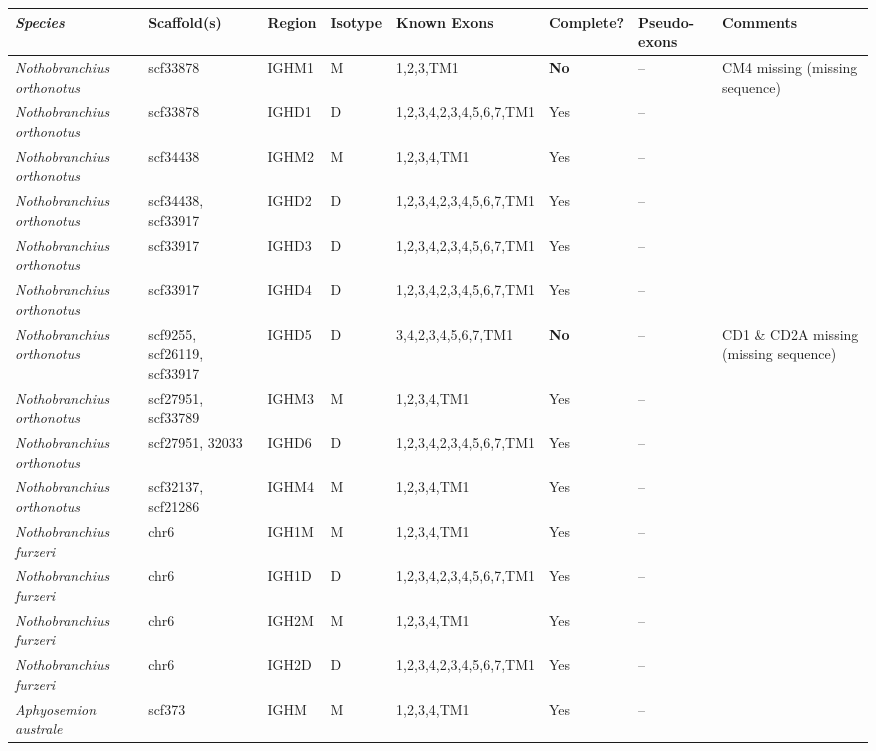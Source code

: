 	\begin{landscape}
	\centering
	\vspace*{\fill}
    \scriptsize
    \begin{threeparttable}
\begin{tabular}{>{\itshape}lllllllp{4cm}}
  \toprule \textnormal{\textbf{Species}} & \textbf{Scaffold(s)} & \textbf{Region} & \textbf{Isotype} & \textbf{Known Exons} \tnote{1} & \textbf{Complete?} & \textbf{Pseudo-exons} & \textbf{Comments} \\ 
  \midrule Nothobranchius orthonotus & scf33878 & IGHM1 & M & 1,2,3,TM1 & \textbf{No} & -- & CM4 missing (missing sequence) \\ 
  Nothobranchius orthonotus & scf33878 & IGHD1 & D & 1,2,3,4,2,3,4,5,6,7,TM1 & Yes & -- &  \\ 
  Nothobranchius orthonotus & scf34438 & IGHM2 & M & 1,2,3,4,TM1 & Yes & -- &  \\ 
  Nothobranchius orthonotus & scf34438, scf33917 & IGHD2 & D & 1,2,3,4,2,3,4,5,6,7,TM1 & Yes & -- &  \\ 
  Nothobranchius orthonotus & scf33917 & IGHD3 & D & 1,2,3,4,2,3,4,5,6,7,TM1 & Yes & -- &  \\ 
  Nothobranchius orthonotus & scf33917 & IGHD4 & D & 1,2,3,4,2,3,4,5,6,7,TM1 & Yes & -- &  \\ 
  Nothobranchius orthonotus & scf9255, scf26119, scf33917 & IGHD5 & D & 3,4,2,3,4,5,6,7,TM1 & \textbf{No} & -- & CD1 \& CD2A missing (missing sequence) \\ 
  Nothobranchius orthonotus & scf27951, scf33789 & IGHM3 & M & 1,2,3,4,TM1 & Yes & -- &  \\ 
  Nothobranchius orthonotus & scf27951, 32033 & IGHD6 & D & 1,2,3,4,2,3,4,5,6,7,TM1 & Yes & -- &  \\ 
  Nothobranchius orthonotus & scf32137, scf21286 & IGHM4 & M & 1,2,3,4,TM1 & Yes & -- &  \\ 
  Nothobranchius furzeri & chr6 \tnote{2} & IGH1M & M & 1,2,3,4,TM1 & Yes & -- &  \\ 
  Nothobranchius furzeri & chr6 \tnote{2} & IGH1D & D & 1,2,3,4,2,3,4,5,6,7,TM1 & Yes & -- &  \\ 
  Nothobranchius furzeri & chr6 \tnote{2} & IGH2M & M & 1,2,3,4,TM1 & Yes & -- &  \\ 
  Nothobranchius furzeri & chr6 \tnote{2} & IGH2D & D & 1,2,3,4,2,3,4,5,6,7,TM1 & Yes & -- &  \\ 
  Aphyosemion australe & scf373 & IGHM & M & 1,2,3,4,TM1 & Yes & -- &  \\ 

\end{tabular}
\end{threeparttable}
\end{landscape}
